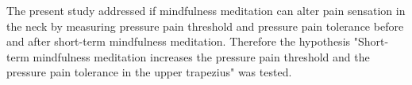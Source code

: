 The present study addressed if mindfulness meditation can alter pain sensation in the neck by measuring pressure pain threshold and pressure pain tolerance before and after short-term mindfulness meditation.
Therefore the hypothesis "Short-term mindfulness meditation increases the pressure pain threshold and the pressure pain tolerance in the upper trapezius" was tested.
